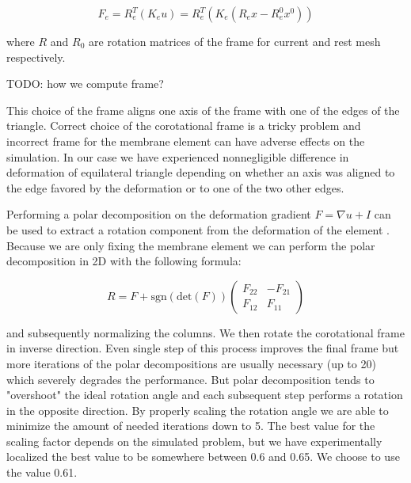 \documentclass{egpubl}
\begin{document}
\begin{equation}
    F_e = R_e^T (K_e u) = R_e^T \left(K_e(R_e x - R_e^0 x^0)\right)
\end{equation}

\noindent
where $R$ and $R_0$ are rotation matrices of the frame for current and rest
mesh respectively.

TODO: how we compute frame?



This choice of the frame aligns one axis of the frame with one of the edges
of the triangle. Correct choice of the corotational frame is a tricky
problem \cite{Felippa2005} and incorrect frame for the membrane element can
have adverse effects on the simulation. In our case we have experienced
nonnegligible difference in deformation of equilateral triangle depending
on whether an axis was aligned to the edge favored by the deformation or to
one of the two other edges.

Performing a polar decomposition on the deformation gradient $F = \nabla u
+ I$ can be used to extract a rotation component from the deformation of
the element \cite{Ciarlet1994}. Because we are only fixing the membrane
element we can perform the polar decomposition in 2D with the following
formula:

\begin{equation}
    R = F + \mathrm{sgn}(\mathrm{det}(F)) \begin{pmatrix}
        F_{22} & - F_{21} \\
        F_{12} & F_{11}
    \end{pmatrix}
\end{equation}

\noindent
and subsequently normalizing the columns. We then rotate the corotational
frame in inverse direction. Even single step of this process improves the
final frame but more iterations of the polar decompositions are usually
necessary (up to 20) which severely degrades the performance. But polar
decomposition tends to "overshoot" the ideal rotation angle and each
subsequent step performs a rotation in the opposite direction. By properly
scaling the rotation angle we are able to minimize the amount of needed
iterations down to 5. The best value for the scaling factor depends on the
simulated problem, but we have experimentally localized the best value to
be somewhere between 0.6 and 0.65. We choose to use the value 0.61.
\end{document}
